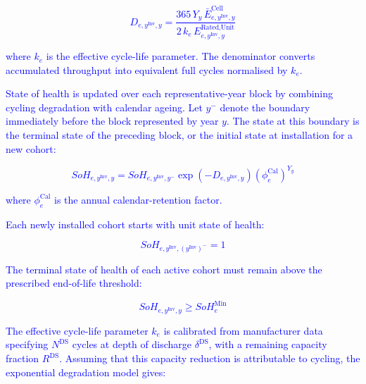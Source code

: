 \documentclass[preprint,12pt]{elsarticle}
\begin{document}
\textcolor{blue}{
    \begin{equation}
        D_{e,y^\text{Inv},y} =
        \frac{365 \, Y_y \, \bar{E}^{\text{Cell}}_{e,y^\text{Inv},y}}
             {2 \, k_e \, E^{\text{Rated,Unit}}_{e,y^\text{Inv},y}}
        \label{eq:cycling_loss}
    \end{equation}
}

\noindent
\textcolor{blue}{
    where $k_e$ is the effective cycle-life parameter. The denominator converts accumulated throughput into equivalent full cycles normalised by $k_e$.
}

\textcolor{blue}{
    State of health is updated over each representative-year block by combining cycling degradation with calendar ageing.
    Let $y^{-}$ denote the boundary immediately before the block represented by year $y$. The state at this boundary is the terminal state of the preceding block, or the initial state at installation for a new cohort:
}

\textcolor{blue}{
    \begin{equation}
        SoH_{e,y^{\text{Inv}},y}
        =
        SoH_{e,y^{\text{Inv}},y^{-}}
        \exp\!\left(-D_{e,y^{\text{Inv}},y}\right)
        \left(\phi^{\text{Cal}}_e\right)^{Y_y}
        \label{eq:soh_chain}
    \end{equation}
}

\noindent
\textcolor{blue}{
    where $\phi^{\text{Cal}}_e$ is the annual calendar-retention factor.
}

\textcolor{blue}{
    Each newly installed cohort starts with unit state of health:
}

\textcolor{blue}{
    \begin{equation}
        SoH_{e,y^{\text{Inv}},(y^{\text{Inv}})^{-}} = 1
        \label{eq:soh_initial}
    \end{equation}
}

\textcolor{blue}{
    The terminal state of health of each active cohort must remain above the prescribed end-of-life threshold:
}

\textcolor{blue}{
    \begin{equation}
        SoH_{e,y^\text{Inv},y} \ge SoH^{\text{Min}}_e
        \label{eq:soh_floor}
    \end{equation}
}

\textcolor{blue}{
    The effective cycle-life parameter $k_e$ is calibrated from manufacturer data specifying $N^{\text{DS}}$ cycles at depth of discharge $\delta^{\text{DS}}$, with a remaining capacity fraction $R^{\text{DS}}$. Assuming that this capacity reduction is attributable to cycling, the exponential degradation model gives:
}
\end{document}
